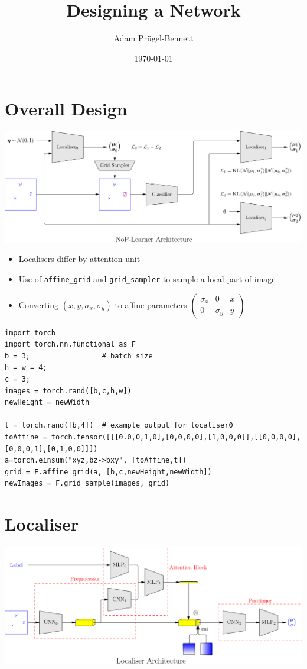 \documentclass[11pt]{article}
\author{Adam Prügel-Bennett}
\date{\today}
\title{Designing a Network}
\begin{document}
\maketitle

\section{Overall Design}
\label{sec:org28952ba}
\begin{center}
\includegraphics[width=.9\linewidth]{./figures/nopArchitecture.pdf}
\end{center}

\begin{itemize}
\item Localisers differ by attention unit
\item Use of \texttt{affine\_grid} and \texttt{grid\_sampler} to sample a local part of
image
\item Converting \((x,y,\sigma_x,\sigma_y)\) to affine parameters
\(\begin{pmatrix} \sigma_x & 0 & x\\ 0 & \sigma_y& y\end{pmatrix}\)
\end{itemize}
\begin{verbatim}
import torch
import torch.nn.functional as F
b = 3;                 # batch size
h = w = 4;
c = 3;
images = torch.rand([b,c,h,w])
newHeight = newWidth

t = torch.rand([b,4])  # example output for localiser0
toAffine = torch.tensor([[[0.0,0,1,0],[0,0,0,0],[1,0,0,0]],[[0,0,0,0],[0,0,0,1],[0,1,0,0]]])
a=torch.einsum("xyz,bz->bxy", [toAffine,t])
grid = F.affine_grid(a, [b,c,newHeight,newWidth])
newImages = F.grid_sample(images, grid)
\end{verbatim}

\section{Localiser}
\label{sec:org72fc6f0}
\begin{center}
\includegraphics[width=.9\linewidth]{./figures/localiser.pdf}
\end{center}
\end{document}
